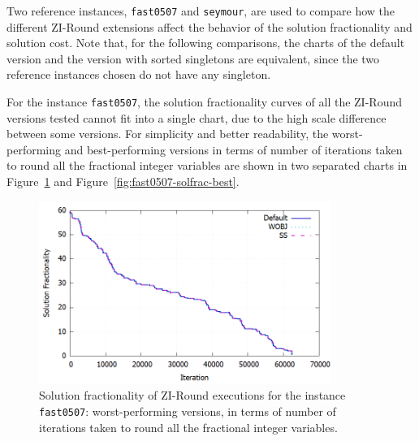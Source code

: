 \documentclass[a4paper,12pt]{book}
\begin{document}
Two reference instances, \texttt{fast0507} and \texttt{seymour}, are used to compare how the different ZI-Round extensions affect the behavior of the solution fractionality and solution cost. Note that, for the following comparisons, the charts of the default version and the version with sorted singletons are equivalent, since the two reference instances chosen do not have any singleton. \par

For the instance \texttt{fast0507}, the solution fractionality curves of all the ZI-Round versions tested cannot fit into a single chart, due to the high scale difference between some versions. For simplicity and better readability, the worst-performing and best-performing versions in terms of number of iterations taken to round all the fractional integer variables are shown in two separated charts in Figure~\ref{fig:fast0507-solfrac-worst} and Figure~\ref{fig:fast0507-solfrac-best}.
\begin{figure}[ht]
	\centering
	\includegraphics[width=0.85\textwidth]{fast0507-solfrac-worst.png}
	\caption{Solution fractionality of ZI-Round executions for the instance \texttt{fast0507}: worst-performing versions, in terms of number of iterations taken to round all the fractional integer variables.}
	\label{fig:fast0507-solfrac-worst}
\end{figure}
\end{document}
